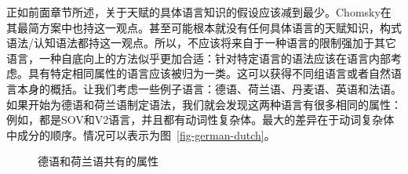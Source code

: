 正如前面章节所述，关于天赋的具体语言知识的假设应该减到最少。Chomsky在其最简方案中也持这一观点。甚至可能根本就没有任何具体语言的天赋知识，构式语法/认知语法都持这一观点。所以，不应该将来自于一种语言的限制强加于其它语言，一种自底向上的方法似乎更加合适：针对特定语言的语法应该在语言内部考虑。具有特定相同属性的语言应该被归为一类。这可以获得不同组语言或者自然语言本身的概括。让我们考虑一些例子语言：德语、荷兰语、丹麦语、英语和法语。如果开始为德语和荷兰语制定语法，我们就会发现这两种语言有很多相同的属性：例如，都是SOV和V2语言，并且都有动词性复杂体。最大的差异在于动词复杂体中成分的顺序。情况可以表示为图~\vref{fig-german-dutch}。
\begin{figure}
\centering
{}
\caption{\label{fig-german-dutch}德语和荷兰语共有的属性}
\end{figure}%
